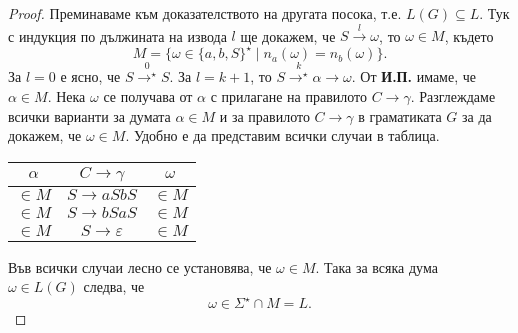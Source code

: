 \begin{proof}
  Преминаваме към доказателството на другата посока, т.е. $L(G) \subseteq L$.
  Тук с индукция по дължината на извода $l$ ще докажем, че
  $S \stackrel{l}{\rightarrow} \omega$, то $\omega \in M$,
  където
  \[M = \{\omega \in \{a,b,S\}^\star \mid n_a(\omega) = n_b(\omega)\}.\]
  За $l = 0$  е ясно, че $S \stackrel{0}{\rightarrow^\star} S$.
  За $l = k+1$, то $S \stackrel{k}{\rightarrow^\star} \alpha \rightarrow \omega$.
  От {\bf И.П.} имаме, че $\alpha \in M$.
  Нека $\omega$ се получава от $\alpha$ с прилагане на правилото $C \rightarrow \gamma$.
  Разглеждаме всички варианти за думата $\alpha \in M$ и за правилото $C\rightarrow \gamma$ в граматиката $G$
  за да докажем, че  $\omega \in M$.
  Удобно е да представим всички случаи в таблица.
  \begin{center}
    \begin{tabular}{| c | c | c |}
      \hline
      $\alpha$ & $C \rightarrow \gamma$ & $\omega$ \\ \hline
      $\in M$ & $S \rightarrow aSbS$ & $\in M$ \\ \hline
      $\in M$ & $S \rightarrow bSaS$ & $\in M$ \\ \hline
      $\in M$ & $S \rightarrow \varepsilon$ & $\in M$ \\ \hline
    \end{tabular}
  \end{center}
  Във всички случаи лесно се установява, че $\omega \in M$.
  Така за всяка дума $\omega \in L(G)$ следва, че
  \[\omega \in \Sigma^\star \cap M = L.\]
\end{proof}

